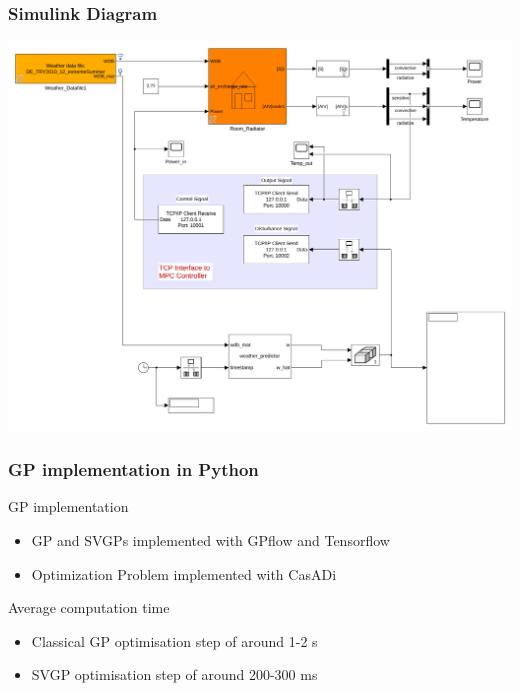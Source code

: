 \begin{frame}
    \frametitle{Simulink Diagram}
    \centering
    \includegraphics[height=0.75\textheight]{Images/polydome_python.pdf}
\end{frame}

\begin{frame}
    \frametitle{GP implementation in Python}
    \begin{block}{GP implementation}
        \vspace{10pt}
        \begin{itemize}
            \item GP and SVGPs implemented with GPflow and Tensorflow \vspace{10pt}
            \item Optimization Problem implemented with CasADi \vspace{10pt}
        \end{itemize}
    \end{block}

    \begin{block}{Average computation time}
        \vspace{10pt}
        \begin{itemize}
            \item Classical GP optimisation step of around 1-2 s \vspace{10pt}
            \item SVGP optimisation step of around 200-300 ms \vspace{10pt}
        \end{itemize}
    \end{block}

\end{frame}

